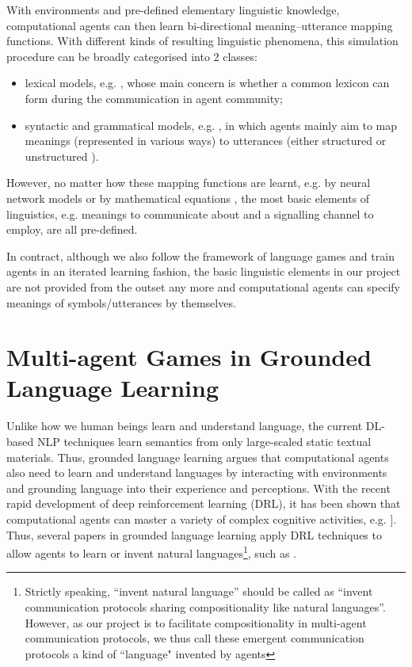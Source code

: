 With environments and pre-defined elementary linguistic knowledge, computational agents can then learn bi-directional meaning–utterance mapping functions\cite{gong2013computer}. With different kinds of resulting linguistic phenomena, this simulation procedure can be broadly categorised into 2 classes:
\begin{itemize}
  \item lexical models, e.g. \cite{steels2005emergence, baronchelli2006sharp, puglisi2008cultural}, whose main concern is whether a common lexicon can form during the communication in agent community;
  \item syntactic and grammatical models, e.g. \cite{kirby1999function, vogt2005acquisition}, in which agents mainly aim to map meanings (represented in various ways) to utterances (either structured or unstructured ).
\end{itemize}

However, no matter how these mapping functions are learnt, e.g. by neural network models \cite{munroe2002learning} or by mathematical equations \cite{minett2008modelling, ke2008language}, the most basic elements of linguistics, e.g. meanings to communicate about and a signalling channel to employ, are all pre-defined.

In contract, although we also follow the framework of language games and train agents in an iterated learning fashion, the basic linguistic elements in our project are not provided from the outset any more and computational agents can specify meanings of symbols/utterances by themselves.

\section{Multi-agent Games in Grounded Language Learning}
\label{sec2.2:gll}

Unlike how we human beings learn and understand language, the current DL-based NLP techniques learn semantics from only large-scaled static textual materials. Thus, grounded language learning argues that computational agents also need to learn and understand languages by interacting with environments and grounding language into their experience and perceptions. With the recent rapid development of deep reinforcement learning (DRL), it has been shown that computational agents can master a variety of complex cognitive activities, e.g. \cite{mnih2015human, silver2017mastering}]. Thus, several papers in grounded language learning apply DRL techniques to allow agents to learn or invent natural languages\footnote{Strictly speaking, ``invent natural language'' should be called as ``invent communication protocols sharing compositionality like natural languages''. However, as our project is to facilitate compositionality in multi-agent communication protocols, we thus call these emergent communication protocols a kind of ``language" invented by agents}, such as \cite{hermann2017grounded, mordatch2018emergence, havrylov2017emergence, hill2017understanding}.

